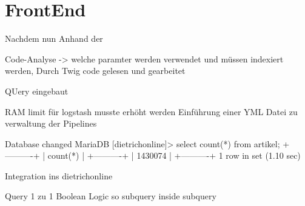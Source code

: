 \chapter{FrontEnd}

Nachdem nun Anhand der 

Code-Analyse -> welche paramter werden verwendet und müssen indexiert werden,
Durch Twig code gelesen und gearbeitet

QUery eingebaut

RAM limit für logstash musste erhöht werden
Einführung einer YML Datei zu verwaltung der Pipelines

Database changed
MariaDB [dietrichonline]> select count(*) from artikel;
+----------+
| count(*) |
+----------+
|  1430074 |
+----------+
1 row in set (1.10 sec)

Integration ins dietrichonline

Query 1 zu 1 
Boolean Logic so subquery inside subquery
